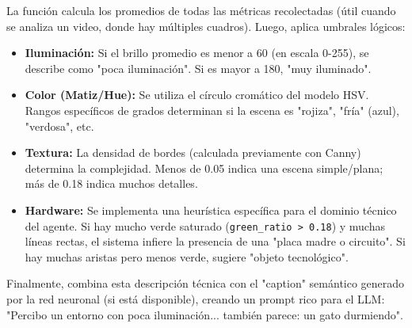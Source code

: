\documentclass[letterpaper,12pt]{article}
\begin{document}
La función calcula los promedios de todas las métricas recolectadas (útil cuando se analiza un video, donde hay múltiples cuadros). Luego, aplica umbrales lógicos:
\begin{itemize}
    \item \textbf{Iluminación:} Si el brillo promedio es menor a 60 (en escala 0-255), se describe como "poca iluminación". Si es mayor a 180, "muy iluminado".
    \item \textbf{Color (Matiz/Hue):} Se utiliza el círculo cromático del modelo HSV. Rangos específicos de grados determinan si la escena es "rojiza", "fría" (azul), "verdosa", etc.
    \item \textbf{Textura:} La densidad de bordes (calculada previamente con Canny) determina la complejidad. Menos de 0.05 indica una escena simple/plana; más de 0.18 indica muchos detalles.
    \item \textbf{Hardware:} Se implementa una heurística específica para el dominio técnico del agente. Si hay mucho verde saturado (\texttt{green\_ratio > 0.18}) y muchas líneas rectas, el sistema infiere la presencia de una "placa madre o circuito". Si hay muchas aristas pero menos verde, sugiere "objeto tecnológico".
\end{itemize}

Finalmente, combina esta descripción técnica con el "caption" semántico generado por la red neuronal (si está disponible), creando un prompt rico para el LLM: "Percibo un entorno con poca iluminación... también parece: un gato durmiendo".
\end{document}
